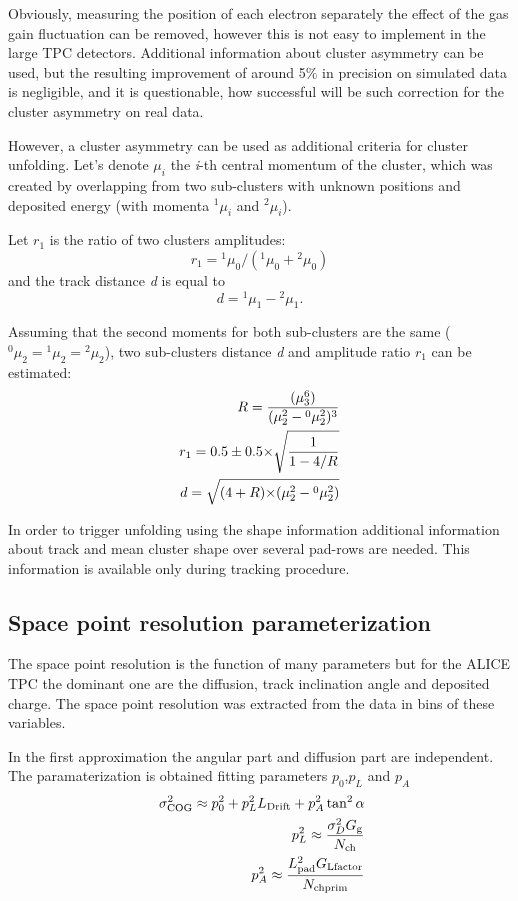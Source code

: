 \documentclass[a4paper,12pt]{article}
\begin{document}
Obviously, measuring the position of each electron separately the
effect of the gas gain fluctuation can be removed, however this is
not easy to implement in the large TPC detectors. Additional
information about cluster asymmetry can be used, but the resulting
improvement of around 5\% in precision on simulated data  is
negligible, and it is questionable, how successful will be such
correction for the cluster asymmetry on real data.

However, a cluster asymmetry can be used as additional  criteria
for cluster unfolding. Let's denote $\mu_i$ the {\it{i}}-th
central momentum of the cluster, which was created by overlapping
from two sub-clusters with unknown positions and deposited energy
(with momenta $^1\mu_i$ and $^2\mu_i$).

Let $r_1$ is the ratio of two clusters amplitudes:
\[r_1={^1\mu_0}/({^1\mu_0}+{^2\mu_0})\] and the track  distance {\it{d}} is equal to
\[d = {^1\mu_1} -{^2\mu_1}.\]

Assuming that the second moments for both sub-clusters are the
same (${^0\mu_2}={^1\mu_2}={^2\mu_2}$), two sub-clusters distance
{\it{d}} and amplitude ratio $r_1$ can be estimated:
\begin{eqnarray}
     R   = \frac{(\mu_3^6)}{(\mu_2^2-{^0\mu_2^2})^3}\\
    r_{\rm{1}} =0.5\pm0.5{\times}\sqrt{\frac{1}{1-4/R}}  \\
    d   = \sqrt{(4+R){\times}(\mu_2^2-{^0\mu_2^2})}
\label{eqMeas}
\end{eqnarray}

In order to trigger unfolding using the shape information
additional  information about track and mean cluster shape over
several pad-rows are needed. This information is available only
during tracking procedure.



\subsection{Space point resolution parameterization}

The space point resolution is the function of many parameters but for the ALICE TPC the dominant one are the diffusion, track inclination angle and deposited charge.
The space point resolution was extracted from the data in bins of these variables.

In the first approximation the angular part and diffusion part are independent. The
paramaterization is obtained fitting parameters $p_{0}$,$p_L$ and $p_A$
\begin{eqnarray}\
     \sigma^2_{{\rm{COG}}} \approx p^2_0+p^2_{L}L_{\rm{Drift}}+p^2_{A}\tan^2\alpha
         \label{eqResCOG0}  
     \nonumber\\
     p^2_L \approx  \frac{\sigma^2_DG_{\rm{g}}}{N_{\rm{ch}}}
     \nonumber\\
     p^2_A \approx \frac{L_{\rm{pad}}^2G_{\rm{Lfactor}}}{N_{\rm{chprim}}} 
\end{eqnarray}
\end{document}
